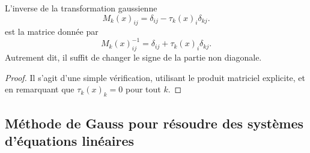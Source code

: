\begin{lemma}       \label{LEMooFHZDooZiKdbr}
    L'inverse de la transformation gaussienne
    \begin{equation}
        M_k(x)_{ij}=\delta_{ij}-\tau_k(x)_i\delta_{kj}.
    \end{equation}
    est la matrice donnée par
    \begin{equation}
        M_k(x)^{-1}_{ij}=\delta_{ij}+\tau_k(x)_i\delta_{kj}.
    \end{equation}
    Autrement dit, il suffit de changer le signe de la partie non diagonale.
\end{lemma}

\begin{proof}
    Il s'agit d'une simple vérification, utilisant le produit matriciel explicite, et en remarquant que \( \tau_k(x)_k=0\) pour tout \( k\).
\end{proof}

\subsection{Méthode de Gauss pour résoudre des systèmes d'équations linéaires}

